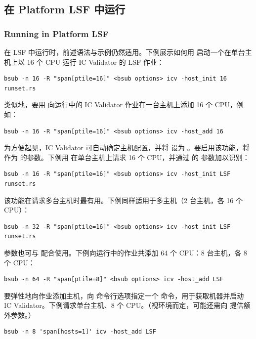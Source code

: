 \subsection{在 Platform LSF 中运行}
\subsubsection*{Running in Platform LSF}

在 LSF 中运行时，前述语法与示例仍然适用。下例展示如何用  启动一个在单台主机上以 16 个 CPU 运行 IC Validator 的 LSF 作业：
\begin{lstlisting}
bsub -n 16 -R "span[ptile=16]" <bsub options> icv -host_init 16
runset.rs
\end{lstlisting}

类似地，要用  向运行中的 IC Validator 作业在一台主机上添加 16 个 CPU，例如：
\begin{lstlisting}
bsub -n 16 -R "span[ptile=16]" <bsub options> icv -host_add 16
\end{lstlisting}

为方便起见，IC Validator 可自动确定主机配置，并将  设为 。要启用该功能，将  作为  的参数。下例用  在单台主机上请求 16 个 CPU，并通过  的  参数加以识别：
\begin{lstlisting}
bsub -n 16 -R "span[ptile=16]" <bsub options> icv -host_init LSF
runset.rs
\end{lstlisting}

该功能在请求多台主机时最有用。下例同样适用于多主机（2 台主机，各 16 个 CPU）：
\begin{lstlisting}
bsub -n 32 -R "span[ptile=16]" <bsub options> icv -host_init LSF
runset.rs
\end{lstlisting}

 参数也可与  配合使用。下例向运行中的作业共添加 64 个 CPU：8 台主机，各 8 个 CPU：
\begin{lstlisting}
bsub -n 64 -R "span[ptile=8]" <bsub options> icv -host_add LSF
\end{lstlisting}

要弹性地向作业添加主机，向  命令行选项指定一个  命令，用于获取机器并启动 IC Validator。下例请求单台主机、8 个 CPU。（视环境而定，可能还需向  提供额外参数。）
\begin{lstlisting}
bsub -n 8 'span[hosts=1]' icv -host_add LSF
\end{lstlisting}

